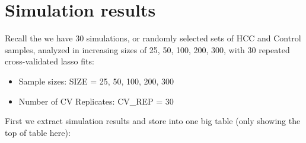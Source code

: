 \documentclass[
]{book}
\begin{document}
\hypertarget{simulation-results}{%
\section{Simulation results}\label{simulation-results}}

Recall the we have 30 simulations, or randomly selected sets of HCC and Control samples,
analyzed in increasing sizes of 25, 50, 100, 200, 300, with
30 repeated cross-validated lasso fits:

\begin{itemize}
\item
  Sample sizes: SIZE = 25, 50, 100, 200, 300
\item
  Number of CV Replicates: CV\_REP = 30
\end{itemize}

First we extract simulation results and store into one big table
(only showing the top of table here):
\end{document}

